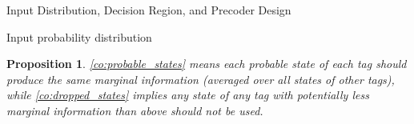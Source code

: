 \documentclass[journal]{IEEEtran}
\newtheorem{proposition}{Proposition}
\begin{document}
\begin{section}{Input Distribution, Decision Region, and Precoder Design}
\begin{subsection}{Input probability distribution}
\begin{proposition}
				\eqref{co:probable_states} means each probable state of each tag should produce the same marginal information (averaged over all states of other tags), while \eqref{co:dropped_states} implies any state of any tag with potentially less marginal information than above should not be used.


\end{proposition}
\end{subsection}
\end{section}
\end{document}
